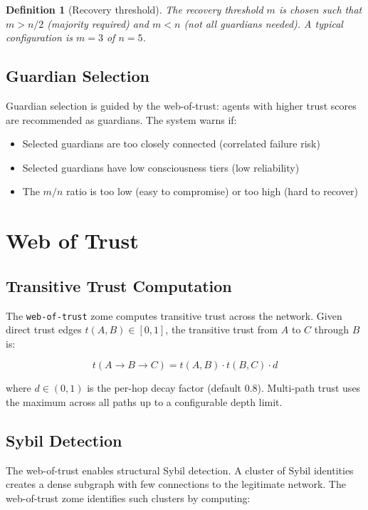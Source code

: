 \documentclass[11pt,twocolumn]{article}
\newtheorem{definition}{Definition}
\begin{document}
\begin{definition}[Recovery threshold]
The recovery threshold $m$ is chosen such that $m > n/2$ (majority required)
and $m < n$ (not all guardians needed). A typical configuration is $m = 3$
of $n = 5$.
\end{definition}

\subsection{Guardian Selection}

Guardian selection is guided by the web-of-trust: agents with higher trust
scores are recommended as guardians. The system warns if:

\begin{itemize}[nosep]
  \item Selected guardians are too closely connected (correlated failure risk)
  \item Selected guardians have low consciousness tiers (low reliability)
  \item The $m/n$ ratio is too low (easy to compromise) or too high (hard to
    recover)
\end{itemize}

\section{Web of Trust}

\subsection{Transitive Trust Computation}

The \texttt{web-of-trust} zome computes transitive trust across the network.
Given direct trust edges $t(A, B) \in [0, 1]$, the transitive trust from
$A$ to $C$ through $B$ is:

\begin{equation}
  t(A \to B \to C) = t(A, B) \cdot t(B, C) \cdot d
\end{equation}

where $d \in (0, 1)$ is the per-hop decay factor (default 0.8). Multi-path
trust uses the maximum across all paths up to a configurable depth limit.

\subsection{Sybil Detection}

The web-of-trust enables structural Sybil detection. A cluster of Sybil
identities creates a dense subgraph with few connections to the legitimate
network. The web-of-trust zome identifies such clusters by computing:
\end{document}
